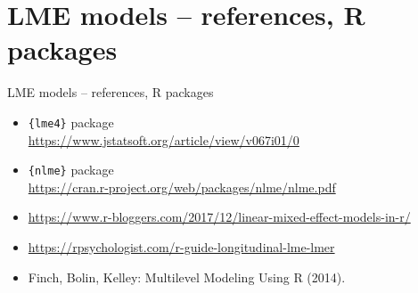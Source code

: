 \documentclass{beamer}
\begin{document}
\section{LME models -- references, R packages}
\small
\begin{frame}{LME models -- references, R packages}
\begin{itemize}
    \item \texttt{\{lme4\}} package \\ \smallskip
    \url{https://www.jstatsoft.org/article/view/v067i01/0}\\
    \bigskip 
    \item \texttt{\{nlme\}} package \\ \smallskip
    \url{https://cran.r-project.org/web/packages/nlme/nlme.pdf}\\
    \bigskip
    \item \url{https://www.r-bloggers.com/2017/12/linear-mixed-effect-models-in-r/}\\
    \bigskip
    \item \textcolor{blue}{\url{https://rpsychologist.com/r-guide-longitudinal-lme-lmer}}\\
    \bigskip
    \item Finch, Bolin, Kelley: Multilevel Modeling Using R (2014).
\end{itemize}
\end{frame}
\end{document}
